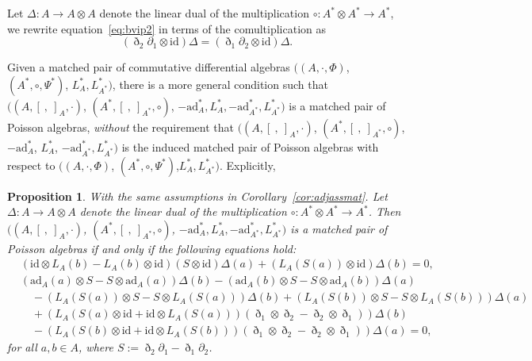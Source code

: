\documentclass[10pt,a4paper]{amsart}
\numberwithin{equation}{section}
\newtheorem{Proposition}[Theorem]{Proposition}
{ \theoremstyle{definition}
	\newtheorem{Definition}[Theorem]{Definition}
	\newtheorem{Note}[Theorem]{Note}
	\newtheorem{Example}[Theorem]{Example}
	\newtheorem{Remark}[Theorem]{Remark} }
\newcommand{\ad}{\mathrm{ad}}
\newcommand{\id}{\mathrm{id}}
\begin{document}
\begin{Remark}\label{rmk:cc}
 Let $\Delta\colon A \to A \otimes A$ denote the linear dual of the multiplication $\circ\colon A^* \otimes A^* \to A^*$, we rewrite equation~\eqref{eq:bvip2} in terms of the comultiplication as
 \begin{equation}
 	(\eth_2\partial_1 \otimes \id)\Delta = (\eth_1\partial_2 \otimes \id)\Delta. \label{eq:vip2}
 \end{equation}
\end{Remark}


Given a matched pair of commutative differential algebras $((A, \cdot, \Phi)$, $(A^*, \circ, \Psi^*)$, $L_{A}^*,L_{A^*}^*)$,
there is a more general condition such that $((A, [\ ,\ ]_A, \cdot)$, $(A^*, [\ ,\ ]_{A^*}, \circ)$, $-\ad_A^*, L_A^*, -\ad_{A^*}^*, L_{A^*}^*)$ is a matched pair of Poisson algebras,
\textit{without} the requirement that $((A, [\ ,\ ]_A, \cdot)$, $(A^*, [\ ,\ ]_{A^*}, \circ)$, $-\ad_A^*$, $L_A^*$, $-\ad_{A^*}^*, L_{A^*}^*)$ is the induced matched pair of Poisson algebras with respect to $((A, \cdot, \Phi)$, $(A^*, \circ, \Psi^*)$,$L_{A}^*,L_{A^*}^*)$.
Explicitly,
\begin{Proposition}\label{pro:gmp}
 With the same assumptions in Corollary~{\rm \ref{cor:adjassmat}}.
 Let $\Delta\colon A \to A \otimes A$ denote the linear dual of the multiplication $\circ\colon A^* \otimes A^* \to A^*$.
 Then $((A, [\ ,\ ]_A, \cdot)$, $(A^*, [\ ,\ ]_{A^*}, \circ)$, $-\ad_A^*, L_A^*, -\ad_{A^*}^*, L_{A^*}^*)$ is a matched pair of Poisson algebras
 if and only if the following equations hold:
 \begin{align}
 &(\id \otimes L_A(b) - L_A(b) \otimes \id )(S \otimes \id) \Delta(a) + ( L_A(S(a)) \otimes \id) \Delta(b)=0, \label{eq:dpb1} \\
 &(\ad_A (a) \otimes S - S \otimes \ad_A (a) )\Delta(b) - (\ad_A (b) \otimes S - S \otimes \ad_A (b) )\Delta(a) \nonumber \\
 &\quad - (L_A(S(a)) \otimes S - S \otimes L_A(S(a)))\Delta(b) + (L_A(S(b)) \otimes S - S \otimes L_A(S(b)))\Delta(a)\nonumber\\
 &\quad + (L_A(S(a) \otimes \id + \id \otimes L_A(S(a)))(\eth_1 \otimes \eth_2 - \eth_2 \otimes \eth_1) )\Delta(b) \nonumber \\
 &\quad - (L_A(S(b) \otimes \id + \id \otimes L_A(S(b)))(\eth_1 \otimes \eth_2 - \eth_2 \otimes \eth_1) )\Delta(a)=0, \label{eq:dpb2}
 \end{align}
 for all $a,b \in A$, where $S:= \eth_2 \partial_1 - \eth_1 \partial_2$.
\end{Proposition}
\end{document}
